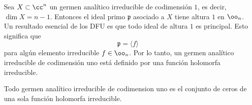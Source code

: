 	Sea $X\subset\cc^n$ un germen analítico irreducible de codimensión $1$, es decir, $\dim X=n-1$. Entonces el ideal primo $\mathfrak{p}$ asociado a $X$ tiene altura $1$ en $\oo_n$. Un resultado esencial de los DFU es que todo ideal de altura $1$ es principal. Esto significa que 
	\begin{equation*}
		\mathfrak{p}=\langle f \rangle 
	\end{equation*}
	para algún elemento irreducible $f\in\oo_n$. Por lo tanto, un germen analítico irreducible de codimensión uno está definido por una función holomorfa irreducible.
	
	\begin{propo}\label{hipersuperficiesenCn}
		Todo germen analítico irreducible de codimension uno es el conjunto de ceros de una sola función holomorfa irreducible.
	\end{propo}

	